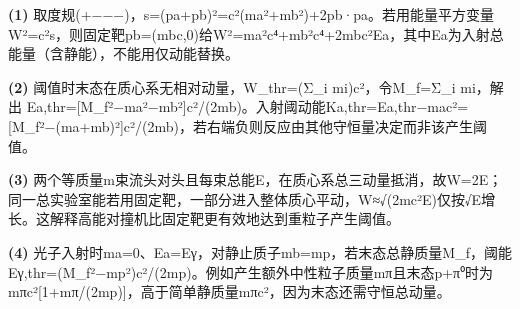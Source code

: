 \par\noindent\textbf{(1)} 取度规(+−−−)，s=(pa+pb)²=c²(ma²+mb²)+2pb·pa。若用能量平方变量W²=c²s，则固定靶pb=(mbc,0)给W²=ma²c⁴+mb²c⁴+2mbc²Ea，其中Ea为入射总能量（含静能），不能用仅动能替换。
\par\noindent\textbf{(2)} 阈值时末态在质心系无相对动量，W\_thr=(Σ\_i mi)c²，令M\_f=Σ\_i mi，解出 Ea,thr=[M\_f²−ma²−mb²]c²/(2mb)。入射阈动能Ka,thr=Ea,thr−mac²=[M\_f²−(ma+mb)²]c²/(2mb)，若右端负则反应由其他守恒量决定而非该产生阈值。
\par\noindent\textbf{(3)} 两个等质量m束流头对头且每束总能E，在质心系总三动量抵消，故W=2E；同一总实验室能若用固定靶，一部分进入整体质心平动，W≈√(2mc²E)仅按√E增长。这解释高能对撞机比固定靶更有效地达到重粒子产生阈值。
\par\noindent\textbf{(4)} 光子入射时ma=0、Ea=Eγ，对静止质子mb=mp，若末态总静质量M\_f，阈能 Eγ,thr=(M\_f²−mp²)c²/(2mp)。例如产生额外中性粒子质量mπ且末态p+π⁰时为mπc²[1+mπ/(2mp)]，高于简单静质量mπc²，因为末态还需守恒总动量。
